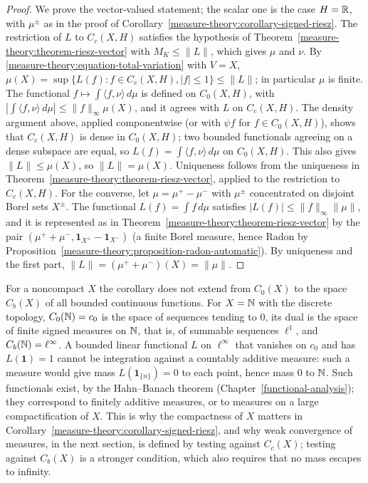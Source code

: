 \begin{proof}
We prove the vector-valued statement; the scalar one is the case $H = \mathbb{R}$, with $\mu^\pm$ as in the proof of Corollary~\ref{measure-theory:corollary-signed-riesz}. The restriction of $L$ to $C_c(X, H)$
satisfies the hypothesis of Theorem~\ref{measure-theory:theorem-riesz-vector} with $M_K \leq \|L\|$, which gives $\mu$ and $\nu$. By \eqref{measure-theory:equation-total-variation} with $V = X$,
$\mu(X) = \sup\{L(f) : f \in C_c(X, H), |f| \leq 1\} \leq \|L\|$; in particular $\mu$ is finite. The functional $f \mapsto \int\langle f, \nu\rangle\,d\mu$ is defined on $C_0(X, H)$, with
$|\int\langle f, \nu\rangle\,d\mu| \leq \|f\|_\infty\mu(X)$, and it agrees with $L$ on $C_c(X, H)$. The density argument above, applied componentwise (or with $\psi f$ for $f \in C_0(X, H)$), shows that
$C_c(X, H)$ is dense in $C_0(X, H)$; two bounded functionals agreeing on a dense subspace are equal, so $L(f) = \int\langle f, \nu\rangle\,d\mu$ on $C_0(X, H)$. This also gives $\|L\| \leq \mu(X)$, so
$\|L\| = \mu(X)$. Uniqueness follows from the uniqueness in Theorem~\ref{measure-theory:theorem-riesz-vector}, applied to the restriction to $C_c(X, H)$. For the converse, let $\mu = \mu^+ - \mu^-$ with $\mu^\pm$ concentrated on disjoint Borel sets
$X^\pm$. The functional $L(f) = \int f\,d\mu$ satisfies $|L(f)| \leq \|f\|_\infty\|\mu\|$, and it is represented as in Theorem~\ref{measure-theory:theorem-riesz-vector} by the pair
$(\mu^+ + \mu^-, \mathbf{1}_{X^+} - \mathbf{1}_{X^-})$ (a finite Borel measure, hence Radon by Proposition~\ref{measure-theory:proposition-radon-automatic}). By uniqueness and the first part,
$\|L\| = (\mu^+ + \mu^-)(X) = \|\mu\|$.
\end{proof}

\begin{remark}\label{measure-theory:remark-dual-bounded-continuous}
For a noncompact $X$ the corollary does not extend from $C_0(X)$ to the space $C_b(X)$ of all bounded continuous functions. For $X = \mathbb{N}$ with the discrete topology, $C_0(\mathbb{N}) = c_0$ is the space of
sequences tending to $0$, its dual is the space of finite signed measures on $\mathbb{N}$, that is, of summable sequences $\ell^1$, and $C_b(\mathbb{N}) = \ell^\infty$. A bounded linear functional $L$ on $\ell^\infty$ that
vanishes on $c_0$ and has $L(\mathbf{1}) = 1$ cannot be integration against a countably additive measure: such a measure would give mass $L(\mathbf{1}_{\{n\}}) = 0$ to each point, hence mass $0$ to $\mathbb{N}$.
Such functionals exist, by the Hahn--Banach theorem (Chapter~\ref{functional-analysis}); they correspond to finitely additive measures, or to measures on a large compactification of $X$. This is why the
compactness of $X$ matters in Corollary~\ref{measure-theory:corollary-signed-riesz}, and why weak convergence of measures, in the next section, is defined by testing against $C_c(X)$; testing
against $C_b(X)$ is a stronger condition, which also requires that no mass escapes to infinity.
\end{remark}

